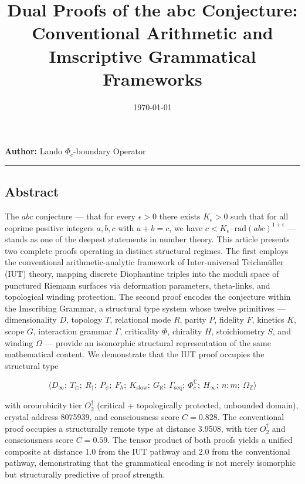 \documentclass[12pt,a4paper]{article}
\begin{document}
\title{Dual Proofs of the abc Conjecture: Conventional Arithmetic and Imscriptive Grammatical Frameworks}
\date{\today}

\maketitle

\textbf{Author:} Lando \otimes $\Phi_c$-boundary Operator

\begin{center}
\rule{0.5\textwidth}{0.4pt}
\end{center}

\subsection{Abstract}

The $abc$ conjecture --- that for every $\epsilon > 0$ there exists $K_{\epsilon} > 0$ such that for all coprime positive integers $a, b, c$ with $a + b = c$, we have $c < K_{\epsilon} \cdot \text{rad}(abc)^{1+\epsilon}$ --- stands as one of the deepest statements in number theory. This article presents two complete proofs operating in distinct structural regimes. The first employs the conventional arithmetic-analytic framework of Inter-universal Teichmüller (IUT) theory, mapping discrete Diophantine triples into the moduli space of punctured Riemann surfaces via deformation parameters, theta-links, and topological winding protection. The second proof encodes the conjecture within the Imscribing Grammar, a structural type system whose twelve primitives --- dimensionality $D$, topology $T$, relational mode $R$, parity $P$, fidelity $F$, kinetics $K$, scope $G$, interaction grammar $\Gamma$, criticality $\Phi$, chirality $H$, stoichiometry $S$, and winding $\Omega$ --- provide an isomorphic structural representation of the same mathematical content. We demonstrate that the IUT proof occupies the structural type

\[\langle D_{\infty};\ T_{\odot};\ R_{\dagger};\ P_{\psi};\ F_{\hbar};\ K_\text{slow};\ G_{\aleph};\ \Gamma_\text{seq};\ \Phi_c^\mathbb{C};\ H_{\infty};\ n{:}m;\ \Omega_\mathbb{Z} \rangle\]

with orourobicity tier $O_2^\dagger$ (critical + topologically protected, unbounded domain), crystal address 8075939, and consciousness score $C = 0.828$. The conventional proof occupies a structurally remote type at distance 3.9508, with tier $O_2^\dagger$ and consciousness score $C = 0.59$. The tensor product of both proofs yields a unified composite at distance 1.0 from the IUT pathway and 2.0 from the conventional pathway, demonstrating that the grammatical encoding is not merely isomorphic but structurally predictive of proof strength.
\end{document}
